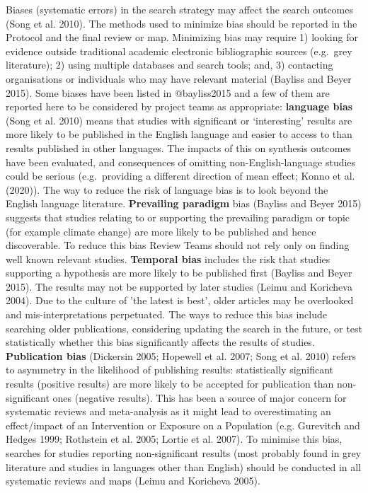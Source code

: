\documentclass[
  letterpaper,
  DIV=11,
  numbers=noendperiod]{scrreprt}
\begin{document}
Biases (systematic errors) in the search strategy may affect the search
outcomes (Song et al. 2010). The methods used to minimize bias should be
reported in the Protocol and the final review or map. Minimizing bias
may require 1) looking for evidence outside traditional academic
electronic bibliographic sources (e.g.~grey literature); 2) using
multiple databases and search tools; and, 3) contacting organisations or
individuals who may have relevant material (Bayliss and Beyer 2015).
Some biases have been listed in @bayliss2015 and a few of them are
reported here to be considered by project teams as appropriate:
\textbf{language bias} (Song et al. 2010) means that studies with
significant or `interesting' results are more likely to be published in
the English language and easier to access to than results published in
other languages. The impacts of this on synthesis outcomes have been
evaluated, and consequences of omitting non-English-language studies
could be serious (e.g.~providing a different direction of mean effect;
Konno et al. (2020)). The way to reduce the risk of language bias is to
look beyond the English language literature. \textbf{Prevailing
paradigm} bias (Bayliss and Beyer 2015) suggests that studies relating
to or supporting the prevailing paradigm or topic (for example climate
change) are more likely to be published and hence discoverable. To
reduce this bias Review Teams should not rely only on finding well known
relevant studies. \textbf{Temporal bias} includes the risk that studies
supporting a hypothesis are more likely to be published first (Bayliss
and Beyer 2015). The results may not be supported by later studies
(Leimu and Koricheva 2004). Due to the culture of 'the latest is best',
older articles may be overlooked and mis-interpretations perpetuated.
The ways to reduce this bias include searching older publications,
considering updating the search in the future, or test statistically
whether this bias significantly affects the results of studies.
\textbf{Publication bias} (Dickersin 2005; Hopewell et al. 2007; Song et
al. 2010) refers to asymmetry in the likelihood of publishing results:
statistically significant results (positive results) are more likely to
be accepted for publication than non-significant ones (negative
results). This has been a source of major concern for systematic reviews
and meta-analysis as it might lead to overestimating an effect/impact of
an Intervention or Exposure on a Population (e.g. Gurevitch and Hedges
1999; Rothstein et al. 2005; Lortie et al. 2007). To minimise this bias,
searches for studies reporting non-significant results (most probably
found in grey literature and studies in languages other than English)
should be conducted in all systematic reviews and maps (Leimu and
Koricheva 2005).
\end{document}
